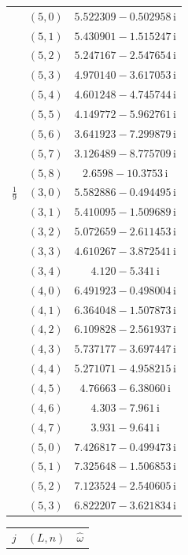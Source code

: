 \begin{table}[H]
\begin{minipage}[t]{0.325\textwidth}
\begin{tabular}[t]{|c|c|c|}
 & $(5,0)$ & $5.522309-0.502958\,\mathrm{i}$ \\
 & $(5,1)$ & $5.430901-1.515247\,\mathrm{i}$ \\
 & $(5,2)$ & $5.247167-2.547654\,\mathrm{i}$ \\
 & $(5,3)$ & $4.970140-3.617053\,\mathrm{i}$ \\
 & $(5,4)$ & $4.601248-4.745744\,\mathrm{i}$ \\
 & $(5,5)$ & $4.149772-5.962761\,\mathrm{i}$ \\
 & $(5,6)$ & $3.641923-7.299879\,\mathrm{i}$ \\
 & $(5,7)$ & $3.126489-8.775709\,\mathrm{i}$ \\
 & $(5,8)$ & $2.6598-10.3753\,\mathrm{i}$ \\
\hline
$\tfrac19$ & $(3,0)$ & $5.582886-0.494495\,\mathrm{i}$ \\
 & $(3,1)$ & $5.410095-1.509689\,\mathrm{i}$ \\
 & $(3,2)$ & $5.072659-2.611453\,\mathrm{i}$ \\
 & $(3,3)$ & $4.610267-3.872541\,\mathrm{i}$ \\
 & $(3,4)$ & $4.120-5.341\,\mathrm{i}$ \\
 & $(4,0)$ & $6.491923-0.498004\,\mathrm{i}$ \\
 & $(4,1)$ & $6.364048-1.507873\,\mathrm{i}$ \\
 & $(4,2)$ & $6.109828-2.561937\,\mathrm{i}$ \\
 & $(4,3)$ & $5.737177-3.697447\,\mathrm{i}$ \\
 & $(4,4)$ & $5.271071-4.958215\,\mathrm{i}$ \\
 & $(4,5)$ & $4.76663-6.38060\,\mathrm{i}$ \\
 & $(4,6)$ & $4.303-7.961\,\mathrm{i}$ \\
 & $(4,7)$ & $3.931-9.641\,\mathrm{i}$ \\
 & $(5,0)$ & $7.426817-0.499473\,\mathrm{i}$ \\
 & $(5,1)$ & $7.325648-1.506853\,\mathrm{i}$ \\
 & $(5,2)$ & $7.123524-2.540605\,\mathrm{i}$ \\
 & $(5,3)$ & $6.822207-3.621834\,\mathrm{i}$ \\
\hline
\end{tabular}
\end{minipage}\hfill
\begin{minipage}[t]{0.325\textwidth}
\centering
\begin{tabular}[t]{|c|c|c|}
\hline
$j$ & $(L,n)$ & $\widehat{\omega}$ \\

\end{tabular}
\end{minipage}
\end{table}
